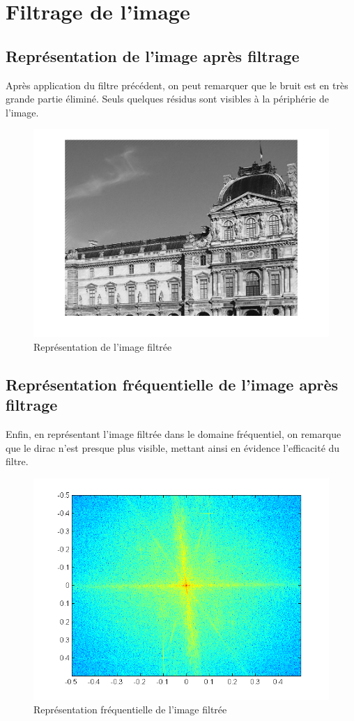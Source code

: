 \documentclass[11pt]{article}
\begin{document}
\section{Filtrage de l'image}
	
	\subsection{Représentation de l'image après filtrage}
	
	Après application du filtre précédent, on peut remarquer que le bruit est en très grande partie éliminé. Seuls quelques résidus sont visibles à la périphérie de l'image.
	
	\begin{figure}[H]
			\centering
			\includegraphics[scale=0.6]{img/monument_filtre.png}
			\caption{Représentation de l'image filtrée}
			\label{monument_filtre}
		\end{figure}


	\subsection{Représentation fréquentielle de l'image après filtrage}
	
	Enfin, en représentant l'image filtrée dans le domaine fréquentiel, on remarque que le dirac n'est presque plus visible, mettant ainsi en évidence l'efficacité du filtre.
	
	\begin{figure}[h]
			\centering
			\includegraphics[scale=0.7]{img/img6.png}
			\caption{Représentation fréquentielle de l'image filtrée}
			\label{img6}
		\end{figure}
\end{document}
